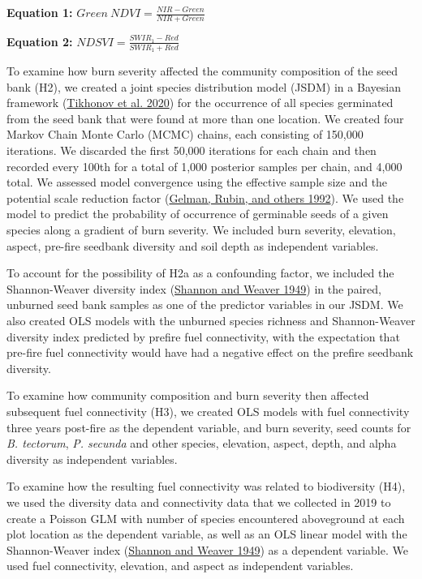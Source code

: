 \documentclass[
  12pt,
]{article}
\begin{document}
\textbf{Equation 1:} \(Green~NDVI = \frac{NIR - Green}{NIR + Green}\)

\textbf{Equation 2:} \(NDSVI = \frac{SWIR_1 - Red}{SWIR_1 + Red}\)

To examine how burn severity affected the community composition of the
seed bank (H2), we created a joint species distribution model (JSDM) in
a Bayesian framework (\protect\hyperlink{ref-HMSC}{Tikhonov et al.
2020}) for the occurrence of all species germinated from the seed bank
that were found at more than one location. We created four Markov Chain
Monte Carlo (MCMC) chains, each consisting of 150,000 iterations. We
discarded the first 50,000 iterations for each chain and then recorded
every 100th for a total of 1,000 posterior samples per chain, and 4,000
total. We assessed model convergence using the effective sample size and
the potential scale reduction factor
(\protect\hyperlink{ref-Gelman1992}{Gelman, Rubin, and others 1992}). We
used the model to predict the probability of occurrence of germinable
seeds of a given species along a gradient of burn severity. We included
burn severity, elevation, aspect, pre-fire seedbank diversity and soil
depth as independent variables.

To account for the possibility of H2a as a confounding factor, we
included the Shannon-Weaver diversity index
(\protect\hyperlink{ref-Shannon1949}{Shannon and Weaver 1949}) in the
paired, unburned seed bank samples as one of the predictor variables in
our JSDM. We also created OLS models with the unburned species richness
and Shannon-Weaver diversity index predicted by prefire fuel
connectivity, with the expectation that pre-fire fuel connectivity would
have had a negative effect on the prefire seedbank diversity.

To examine how community composition and burn severity then affected
subsequent fuel connectivity (H3), we created OLS models with fuel
connectivity three years post-fire as the dependent variable, and burn
severity, seed counts for \emph{B. tectorum}, \emph{P. secunda} and
other species, elevation, aspect, depth, and alpha diversity as
independent variables.

To examine how the resulting fuel connectivity was related to
biodiversity (H4), we used the diversity data and connectivity data that
we collected in 2019 to create a Poisson GLM with number of species
encountered aboveground at each plot location as the dependent variable,
as well as an OLS linear model with the Shannon-Weaver index
(\protect\hyperlink{ref-Shannon1949}{Shannon and Weaver 1949}) as a
dependent variable. We used fuel connectivity, elevation, and aspect as
independent variables.
\end{document}
